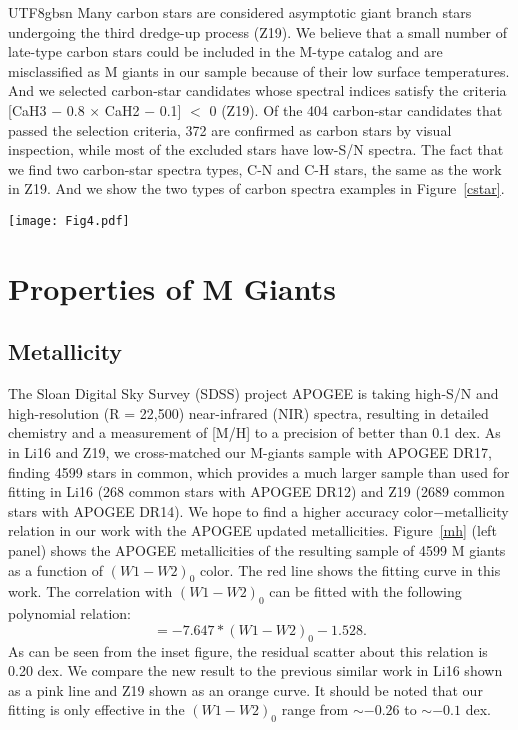 \documentclass[manuscript]{aastex62}
\begin{document}
\begin{CJK*}{UTF8}{gbsn}
Many carbon stars are considered asymptotic giant branch stars undergoing the third dredge-up process (Z19). We believe that a small number of late-type carbon stars could be included in the M-type catalog and are misclassified as M giants in our sample because of their low surface temperatures. And we selected carbon-star candidates whose spectral indices satisfy the criteria [CaH3 $-$ 0.8 $\times $ CaH2 $-$ 0.1] $<$ 0 (Z19). Of the 404 carbon-star candidates that passed the selection criteria, 372 are confirmed as carbon stars by visual inspection, while most of the excluded stars have low-S/N spectra. The fact that we find two carbon-star spectra types, C-N and C-H stars, the same as the work in Z19. And we show the two types of carbon spectra examples in Figure~\ref{cstar}.

\begin{figure*}
  \centering
   \texttt{[image: Fig4.pdf]}
  \caption{Spectrum examples of C-N and C-H stars in our LAMOST-derived catalog.}
   \label{cstar}
\end{figure*}

\section{Properties of M Giants}
\subsection{Metallicity}

The Sloan Digital Sky Survey (SDSS) project APOGEE \citep{holtzman2015} is taking high-S/N and high-resolution (R = 22,500) near-infrared (NIR) spectra, resulting in detailed chemistry and a measurement of [M/H] to a precision of better than 0.1 dex. As in Li16 and Z19, we cross-matched our M-giants sample with APOGEE DR17, finding 4599 stars in common, which provides a much larger sample than used for fitting in Li16 (268 common stars with APOGEE DR12) and Z19 (2689 common stars with APOGEE DR14). We hope to find a higher accuracy color$-$metallicity relation in our work with the APOGEE updated metallicities. 
Figure~\ref{mh} (left panel) shows the APOGEE metallicities of the resulting sample of 4599 M giants as a function of $(W1-W2)_0$ color. The red line shows the fitting curve in this work. The correlation with $(W1-W2)_0$ can be fitted with the following polynomial relation:
\begin{equation}
    [M/H]=-7.647*(W1-W2)_0-1.528.
\end{equation}
As can be seen from the inset figure, the residual scatter about this relation is 0.20 dex. We compare the new result to the previous similar work in Li16 shown as a pink line and Z19 shown as an orange curve. It should be noted that our fitting is only effective in the $(W1-W2)_0$ range from $\sim-0.26$ to $\sim-0.1$ dex. 


\end{CJK*}
\end{document}
